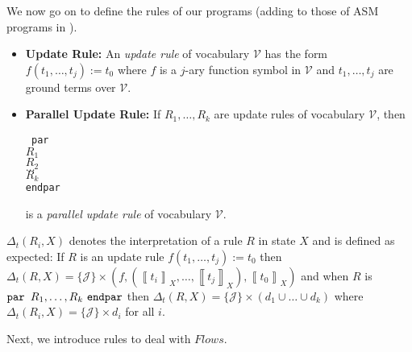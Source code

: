 \documentclass[envcountsame]{llncs}
\newcommand{\U}{\ensuremath{\mathcal {V}}}
\newcommand{\evaluation}[2][]{\ensuremath{\left\llbracket #2\right\rrbracket_{#1}}}
\newcommand{\val}[2]{\evaluation[#2]{#1}}
\newcommand{\update}[3]{(#1,#2,#3)}\spnewtheorem{postulate}{Postulate}{\bfseries}{\itshape}
\newcommand{\J}[1]{\{\JJ\}\times #1}\newcommand{\C}[1]{\{\CC\}\times #1}\newcommand{\JJ}{\mathcal{J}}
\newcommand{\CC}{\mathcal{F}}
\newcommand{\gen}[1]{\Delta_t(#1)}
\newenvironment{ttcode}{\begin{ttfamily}\rm\tt}{\end{ttfamily}}
\newcommand\s{\phantom{x}}
\begin{document}
We now go on to define the rules of our programs (adding to those of ASM
programs  in \cite{Gur00}).



\begin{definition}\begin{itemize}
\item \textbf{Update Rule:}  An \emph{update rule} of vocabulary $\U$ has the
  form $f(t_1,\dots,t_j):=t_0$ where $f$ is a $j$-ary function symbol
  in $\U$ and $t_1,\dots,t_j$ are ground terms over $\U$.



\item \textbf{Parallel Update Rule: }
If $R_1,\dots,R_k$ are update rules of vocabulary $\U$, then
\begin{center}
\begin{minipage}{8cm}
\begin{ttcode}
par \\
\s $R_1$ \\
\s   $R_2$ \\ 
\s $\dots$ \\ 
\s  $R_k$ \\
endpar \\ 
\end{ttcode}
\end{minipage}
\end{center}
is a \emph{parallel update rule} of vocabulary $\U$.
\end{itemize}
\end{definition}

$\gen{R_i,X}$ denotes the interpretation of a rule $R$ in state $X$
and is defined as expected: If $R$ is an update rule $f (t_1,\dots,t_j) := t_0$ then
$\gen{R,X} = \J{\update{f}{{(\val{t_i}{X},\dots,\val{t_j}{X})}}{\val{t_0}{X}}}$
and when $R$ is $\text{\tt par }R_1,\dots,R_k\ \text{\tt endpar}$ then $\gen{R,X} = \J{(d_1 \cup \dots \cup d_k)}$ where $\gen{R_i,X} = \J{d_i }$ for all $i$.

Next, we introduce rules to deal with $\mathit{Flows}$.
\end{document}
